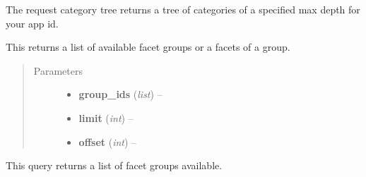\documentclass[letterpaper,10pt,english]{sphinxmanual}
\begin{document}
\begin{fulllineitems}
\begin{fulllineitems}
\begin{quote}
\begin{description}
\end{description}\end{quote}

\end{fulllineitems}


\begin{fulllineitems}
\label{collins:collins.Collins.categorytree}
The request category tree returns a tree of categories of a 
specified max depth for your app id.

\end{fulllineitems}


\begin{fulllineitems}
\label{collins:collins.Collins.facets}
This returns a list of available facet groups or a facets of a group.
\begin{quote}\begin{description}
\item[{Parameters}] \leavevmode\begin{itemize}
\item {} 
\textbf{group\_ids} (\emph{list}) -- 

\item {} 
\textbf{limit} (\emph{int}) -- 

\item {} 
\textbf{offset} (\emph{int}) -- 

\end{itemize}

\end{description}\end{quote}

\end{fulllineitems}


\begin{fulllineitems}
\label{collins:collins.Collins.facettypes}
This query returns a list of facet groups available.

\end{fulllineitems}



\end{fulllineitems}
\end{document}
